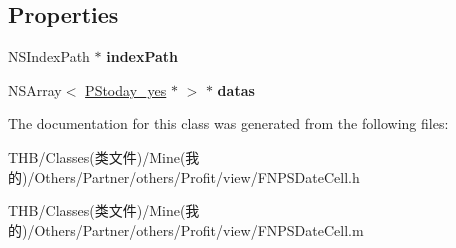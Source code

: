 \subsection*{Properties}
\begin{DoxyCompactItemize}
\item 
\mbox{\label{interface_f_n_p_s_date_cell_ae577b58e6284f14c1d10f0a3759aad45}} 
N\+S\+Index\+Path $\ast$ {\bfseries index\+Path}
\item 
\mbox{\label{interface_f_n_p_s_date_cell_a6038b299a6b18a6763b8025ee2d07bae}} 
N\+S\+Array$<$ \mbox{\hyperlink{interface_p_stoday__yes}{P\+Stoday\+\_\+yes}} $\ast$ $>$ $\ast$ {\bfseries datas}
\end{DoxyCompactItemize}


The documentation for this class was generated from the following files\+:\begin{DoxyCompactItemize}
\item 
T\+H\+B/\+Classes(类文件)/\+Mine(我的)/\+Others/\+Partner/others/\+Profit/view/F\+N\+P\+S\+Date\+Cell.\+h\item 
T\+H\+B/\+Classes(类文件)/\+Mine(我的)/\+Others/\+Partner/others/\+Profit/view/F\+N\+P\+S\+Date\+Cell.\+m\end{DoxyCompactItemize}
